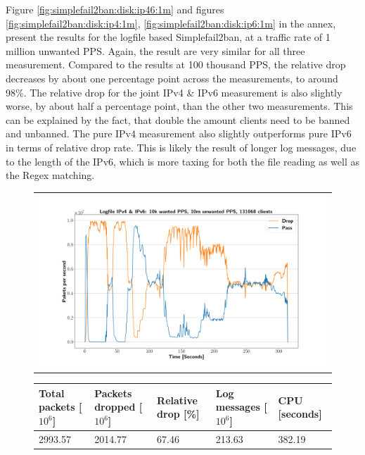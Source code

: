 Figure \ref{fig:simplefail2ban:disk:ip46:1m} and figures \ref{fig:simplefail2ban:disk:ip4:1m}, \ref{fig:simplefail2ban:disk:ip6:1m} in the annex, present the results
for the logfile based Simplefail2ban, at a traffic rate of 1 million unwanted \ac{PPS}. Again, the result are very similar for all three measurement. Compared to the results at 100 thousand \ac{PPS},
the relative drop decreases by about one percentage point across the measurements, to around 98\%. The relative drop for the joint \ac{IPv4} \& \ac{IPv6} measurement is also slightly worse, by about half a percentage point, than the
other two measurements. This can be explained by the fact, that double the amount clients need to be banned and unbanned. The pure \ac{IPv4} measurement also slightly outperforms pure \ac{IPv6} in terms of relative
drop rate. This is likely the result of longer log messages, due to the length of the \ac{IPv6}, which is more taxing for both the file reading as well as the \ac{Regex} matching.      

\begin{figure}[!h]
	\centering
	\scriptsize
	\begin{tabular}{c}
    	\centerline{\includegraphics[width=1.2\textwidth]{images/simplefail2ban_disk_ipv46_v10k_iv10m_c131068.png}}
	\end{tabular}
	\begin{tabular}{lllll}
		\toprule
		\textbf{Total packets [$10^6$]} & \textbf{Packets dropped [$10^6$]} & \textbf{Relative drop [\%]} & \textbf{Log messages [$10^6$]} & \textbf{CPU [seconds]} \\ \midrule 
		2993.57 & 2014.77 & 67.46 & 213.63 & 382.19 \\
		\bottomrule
	\end{tabular}
	\caption[Simplefail2ban, Logfile IPv4 \& IPv6, 10m \ac{PPS}]{}
	\label{fig:simplefail2ban:disk:ip46:10m}
\end{figure}

